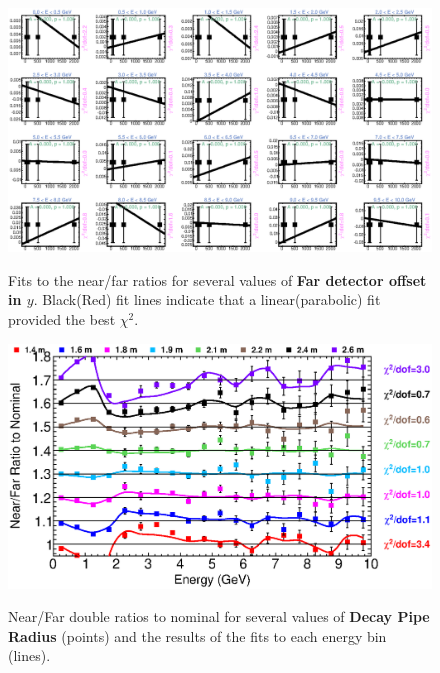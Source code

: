 {\begin{figure}[ht]
  \begin{center}
    {\includegraphics[width=5.0in]{figures/LBNEFDY_nof_fits.eps}}
  \end{center}
\caption{ Fits to the near/far ratios for several values of {\bf Far detector offset in $y$}. Black(Red) fit lines indicate that a linear(parabolic) fit provided the best $\chi^2$. }
\end{figure}

\begin{figure}[ht]
  \begin{center}
    {\includegraphics[width=6.0in]{figures/DecayPipeRadius_nof_summary.eps}}
  \end{center}
\caption{ Near/Far double ratios to nominal for several values of {\bf Decay Pipe Radius} (points) and the results of the fits to each energy bin (lines).}
\end{figure}

}
